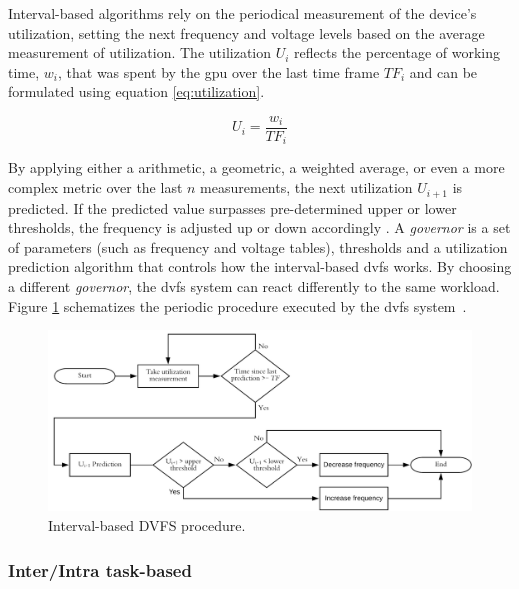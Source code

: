 Interval-based algorithms rely on the periodical measurement of the device's utilization, setting the next frequency and voltage levels based on the average measurement of utilization. The utilization $U_{i}$ reflects the percentage of working time, $w_{i}$, that was spent by the \acrshort{gpu} over the last time frame $TF_{i}$ and can be formulated using equation \ref{eq:utilization}.

\begin{equation}
    U_i=\frac{w_i}{TF_i}
    \label{eq:utilization}
\end{equation}

By applying either a arithmetic, a geometric, a weighted average, or even a more complex metric over the last $n$  measurements,  the next utilization $U_{i+1}$ is predicted. If the predicted value surpasses pre-determined upper or lower thresholds, the frequency is adjusted up or down accordingly \cite{seongki_gpgpu-perf:_2015}. 
A \textit{governor} is a set of parameters (such as frequency and voltage tables), thresholds and a utilization prediction algorithm that controls how the interval-based \acrshort{dvfs} works. By choosing a different \textit{governor}, the \acrshort{dvfs} system can react differently to the same workload. Figure \ref{fig:DVFSprocedure} schematizes the periodic procedure executed by the \acrshort{dvfs} system~\cite{seongki_gpgpu-perf:_2015}. 

\begin{figure}[htb]
  \centering
  \includegraphics[width=\textwidth]{Figures/Background/DVFSprogram.png}
  \caption{Interval-based DVFS procedure.}
  \label{fig:DVFSprocedure}
\end{figure}

\subsubsection{Inter/Intra task-based}

